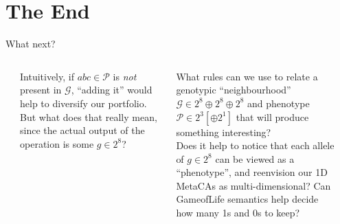 \part{The End}
\frame{\partpage}

\begin{frame}[fragile]{What next?}{}
\begin{columns}[]
\begin{column}[T]{.1cm}
\end{column}
\begin{column}[T]{5.4cm}
\vspace*{.2cm}

{\small Intuitively, if $abc\in\mathcal{P}$ is \emph{not} present in $\mathcal{G}$,
  ``adding it'' would help to diversify our
portfolio.  But what does that really mean, since the
actual output of the operation is some $g\in2^8$?}
\end{column}
\begin{column}[T]{5.3cm}
\vspace{-.05in}
{\small What rules can we use to relate a genotypic ``neighbourhood'' $\mathcal{G}\in 2^8\oplus2^8\oplus2^8$
and phenotype $\mathcal{P}\in 2^3 [\oplus2^1]$ that will produce
something interesting?} \\[.3cm]
\vspace{.1in}
{\small Does it help to notice that each allele of $g\in2^8$ can be viewed as
a ``phenotype'', and reenvision our 1D MetaCAs as multi-dimensional?  Can {Game\bsp of\bsp Life} semantics help decide how many 1s and 0s to keep?}
\end{column}
\begin{column}[T]{.1cm}
\end{column}
\end{columns}
\end{frame}
